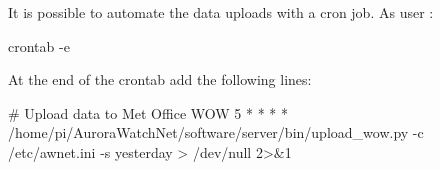 It is possible to automate the data uploads with a cron job. As user
\piUser:
\begin{Cmd}
crontab -e  
\end{Cmd}

At the end of the crontab add the following lines:
\begin{Code}[fontsize=\relsize{-3}]
# Upload data to Met Office WOW
5 * * * * /home/pi/AuroraWatchNet/software/server/bin/upload_wow.py -c /etc/awnet.ini -s yesterday > /dev/null 2>&1
\end{Code}
